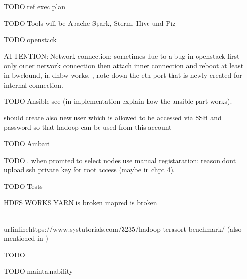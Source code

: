 TODO ref exec plan

TODO Tools will be Apache Spark, Storm, Hive und Pig

TODO openstack

    ATTENTION: Network connection: sometimes due to a bug in openstack first only outer network connection then attach inner connection and reboot at least in bwclound, in dhbw works. 
    , note down the eth port that is newly created for internal connection.
    


TODO Ansible
see 
     (in implementation explain how the ansible part works). 
     
     should create also new user which is allowed to be accessed via SSH and  password so that hadoop can be used from this account

TODO Ambari

    TODO ,  when promted to select nodes use manual registaration: reason dont upload ssh private key for root access (maybe in chpt 4).

TODO Tests

HDFS WORKS
YARN is broken
mapred is broken



\\urlinline{https://www.systutorials.com/3235/hadoop-terasort-benchmark/} (also mentioned in \autocite[][]{white2015hadoop})



TODO

TODO maintainability

